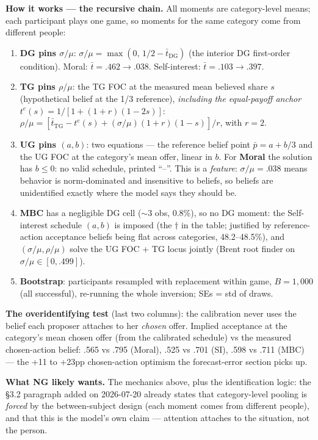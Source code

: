 \documentclass[11pt]{article}
\begin{document}
\textbf{How it works --- the recursive chain.} All moments are category-level means; each participant plays one game, so moments for the same category come from different people:
\begin{enumerate}
\item \textbf{DG pins $\sigma/\mu$}: $\sigma/\mu = \max(0,\, 1/2 - \bar t_{\mathrm{DG}})$ (the interior DG first-order condition). Moral: $\bar t=.462 \to .038$. Self-interest: $\bar t=.103 \to .397$.
\item \textbf{TG pins $\rho/\mu$}: the TG FOC at the measured mean believed share $s$ (hypothetical belief at the 1/3 reference), \emph{including the equal-payoff anchor} $t^{e}(s) = 1/[1+(1+r)(1-2s)]$: $\rho/\mu = [\bar t_{\mathrm{TG}} - t^{e}(s) + (\sigma/\mu)(1+r)(1-s)]/r$, with $r=2$.
\item \textbf{UG pins $(a,b)$}: two equations --- the reference belief point $\bar p = a + b/3$ and the UG FOC at the category's mean offer, linear in $b$. For \textbf{Moral} the solution has $b \le 0$: no valid schedule, printed ``--''. This is a \emph{feature}: $\sigma/\mu=.038$ means behavior is norm-dominated and insensitive to beliefs, so beliefs are unidentified exactly where the model says they should be.
\item \textbf{MBC} has a negligible DG cell ($\sim$3 obs, 0.8\%), so no DG moment: the Self-interest schedule $(a,b)$ is imposed (the $\dagger$ in the table; justified by reference-action acceptance beliefs being flat across categories, 48.2--48.5\%), and $(\sigma/\mu, \rho/\mu)$ solve the UG FOC + TG locus jointly (Brent root finder on $\sigma/\mu \in [0, .499]$).
\item \textbf{Bootstrap}: participants resampled with replacement within game, $B=1{,}000$ (all successful), re-running the whole inversion; SEs = std of draws.
\end{enumerate}

\textbf{The overidentifying test} (last two columns): the calibration never uses the belief each proposer attaches to her \emph{chosen} offer. Implied acceptance at the category's mean chosen offer (from the calibrated schedule) vs the measured chosen-action belief: .565 vs .795 (Moral), .525 vs .701 (SI), .598 vs .711 (MBC) --- the +11 to +23pp chosen-action optimism the forecast-error section picks up.

\textbf{What NG likely wants.} The mechanics above, plus the identification logic: the \S3.2 paragraph added on 2026-07-20 already states that category-level pooling is \emph{forced} by the between-subject design (each moment comes from different people), and that this is the model's own claim --- attention attaches to the situation, not the person.
\end{document}
